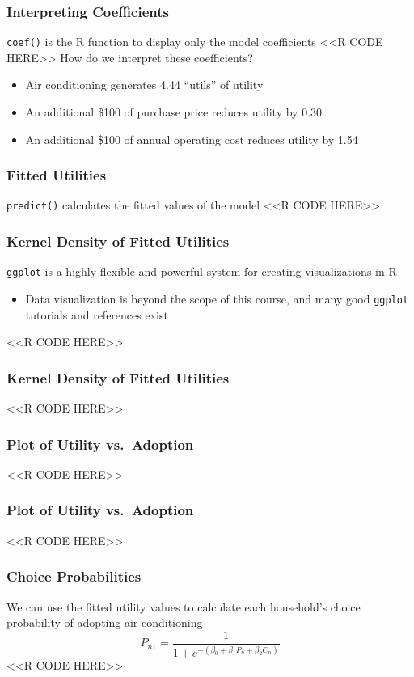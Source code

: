 \documentclass{beamer}
\begin{document}
\begin{frame}[fragile]\frametitle{Interpreting Coefficients}
    \texttt{coef()} is the R function to display only the model coefficients
    <<R CODE HERE>>
    \vspace{2ex}
    How do we interpret these coefficients?
    \begin{itemize}
        \item Air conditioning generates 4.44 ``utils'' of utility
        \item An additional \$100 of purchase price reduces utility by 0.30
        \item An additional \$100 of annual operating cost reduces utility by 1.54
    \end{itemize}
\end{frame}

\begin{frame}[fragile]\frametitle{Fitted Utilities}
    \texttt{predict()} calculates the fitted values of the model
    <<R CODE HERE>>
\end{frame}

\begin{frame}[fragile]\frametitle{Kernel Density of Fitted Utilities}
    \texttt{ggplot} is a highly flexible and powerful system for creating visualizations in R
    \begin{itemize}
        \item Data visualization is beyond the scope of this course, and many good \texttt{ggplot} tutorials and references exist
    \end{itemize}
    <<R CODE HERE>>
\end{frame}

\begin{frame}[fragile]\frametitle{Kernel Density of Fitted Utilities}
    <<R CODE HERE>>
\end{frame}

\begin{frame}[fragile]\frametitle{Plot of Utility vs.\ Adoption}
    <<R CODE HERE>>
\end{frame}

\begin{frame}[fragile]\frametitle{Plot of Utility vs.\ Adoption}
    <<R CODE HERE>>
\end{frame}

\begin{frame}[fragile]\frametitle{Choice Probabilities}
    We can use the fitted utility values to calculate each household's choice probability of adopting air conditioning
    $$P_{n1} = \frac{1}{1 + e^{-(\beta_0 + \beta_1 P_n + \beta_2 C_n)}}$$
    <<R CODE HERE>>
\end{frame}
\end{document}
